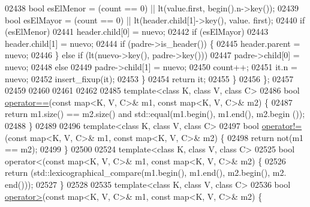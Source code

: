 \begin{DoxyCode}
02438             \textcolor{keywordtype}{bool} esElMenor = (count == 0) || lt(value.first, begin().n->key());
02439             \textcolor{keywordtype}{bool} esElMayor = (count == 0) || lt(header.child[1]->key(), value.
      first);
02440             \textcolor{keywordflow}{if} (esElMenor)
02441                 header.child[0] = nuevo;
02442             \textcolor{keywordflow}{if} (esElMayor)
02443                 header.child[1] = nuevo;
02444             \textcolor{keywordflow}{if} (padre->is\_header()) \{
02445                 header.parent = nuevo;
02446             \} \textcolor{keywordflow}{else} \textcolor{keywordflow}{if} (lt(nuevo->key(), padre->key()))
02447                 padre->child[0] = nuevo;
02448             \textcolor{keywordflow}{else}
02449                 padre->child[1] = nuevo;
02450             count++;
02451             it.n = nuevo;
02452             insert\_fixup(it);
02453         \}
02454         \textcolor{keywordflow}{return} it;
02455     \}
02456 \};
02457 
02459 
02460 
02461 
02462 
02485 \textcolor{keyword}{template}<\textcolor{keyword}{class} K, \textcolor{keyword}{class} V, \textcolor{keyword}{class} C>
02486 \textcolor{keywordtype}{bool} \hyperlink{classaed2_1_1map_abfc51b39670220e79037ac067006e933_abfc51b39670220e79037ac067006e933}{operator==}(\textcolor{keyword}{const} map<K, V, C>& m1, \textcolor{keyword}{const} map<K, V, C>& m2) \{
02487     \textcolor{keywordflow}{return} m1.size() == m2.size() and std::equal(m1.begin(), m1.end(), m2.begin
      ());
02488 \}
02489 
02496 \textcolor{keyword}{template}<\textcolor{keyword}{class} K, \textcolor{keyword}{class} V, \textcolor{keyword}{class} C>
02497 \textcolor{keywordtype}{bool} \hyperlink{classaed2_1_1map_abce0fa35c5b25fd67111c2e704616f09_abce0fa35c5b25fd67111c2e704616f09}{operator!=}(\textcolor{keyword}{const} map<K, V, C>& m1, \textcolor{keyword}{const} map<K, V, C>& m2) \{
02498     \textcolor{keywordflow}{return} not(m1 == m2);
02499 \}
02500 
02524 \textcolor{keyword}{template}<\textcolor{keyword}{class} K, \textcolor{keyword}{class} V, \textcolor{keyword}{class} C>
02525 \textcolor{keywordtype}{bool} operator<(const map<K, V, C>& m1, \textcolor{keyword}{const} map<K, V, C>& m2) \{
02526     \textcolor{keywordflow}{return} (std::lexicographical\_compare(m1.begin(), m1.end(), m2.begin(), m2.
      end()));
02527 \}
02528 
02535 \textcolor{keyword}{template}<\textcolor{keyword}{class} K, \textcolor{keyword}{class} V, \textcolor{keyword}{class} C>
02536 \textcolor{keywordtype}{bool} \hyperlink{classaed2_1_1map_a2000cd874b72034ce7fe730c811b6c63_a2000cd874b72034ce7fe730c811b6c63}{operator>}(\textcolor{keyword}{const} map<K, V, C>& m1, \textcolor{keyword}{const} map<K, V, C>& m2) \{

\end{DoxyCode}
